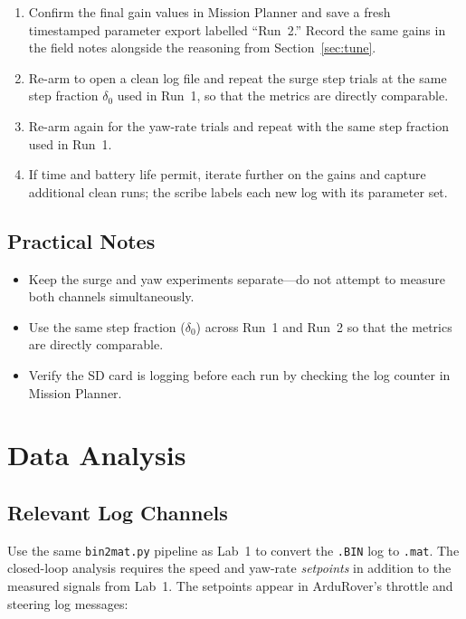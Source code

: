 \documentclass[../../book.tex]{subfiles}
\begin{document}
\begin{enumerate}
  \item Confirm the final gain values in Mission Planner and save a fresh timestamped parameter export labelled ``Run~2.''  Record the same gains in the field notes alongside the reasoning from Section~\ref{sec:tune}.
  \item Re-arm to open a clean log file and repeat the surge step trials at the same step fraction $\delta_0$ used in Run~1, so that the metrics are directly comparable.
  \item Re-arm again for the yaw-rate trials and repeat with the same step fraction used in Run~1.
  \item If time and battery life permit, iterate further on the gains and capture additional clean runs; the scribe labels each new log with its parameter set.
\end{enumerate}

\subsection{Practical Notes}

\begin{itemize}
  \item Keep the surge and yaw experiments separate---do not attempt to measure both channels simultaneously.
  \item Use the same step fraction ($\delta_0$) across Run~1 and Run~2 so that the metrics are directly comparable.
  \item Verify the SD card is logging before each run by checking the log counter in Mission Planner.
\end{itemize}

\section{Data Analysis}

\subsection{Relevant Log Channels}

Use the same \texttt{bin2mat.py} pipeline as Lab~1 to convert the \texttt{.BIN} log to \texttt{.mat}.  The closed-loop analysis requires the speed and yaw-rate \emph{setpoints} in addition to the measured signals from Lab~1.  The setpoints appear in ArduRover's throttle and steering log messages:
\end{document}
